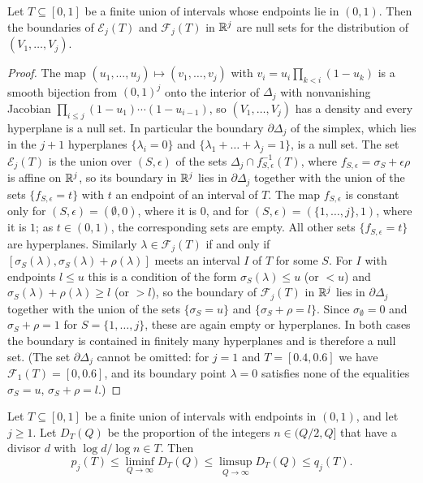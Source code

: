 \documentclass[11pt,colorlinks]{charlie}
\newcommand{\cE}{\mathcal{E}}
\newcommand{\cF}{\mathcal{F}}
\begin{document}
\begin{lemma}\label{lem:continuity}
Let $T\subseteq[0,1]$ be a finite union of intervals whose endpoints lie in $(0,1)$. Then the boundaries of $\cE_j(T)$ and $\cF_j(T)$ in $\mathbb{R}^j$ are null sets for the distribution of $(V_1,\dots,V_j)$.
\end{lemma}

\begin{proof}
The map $(u_1,\dots,u_j)\mapsto(v_1,\dots,v_j)$ with $v_i=u_i\prod_{k<i}(1-u_k)$ is a smooth bijection from $(0,1)^j$ onto the interior of $\Delta_j$ with nonvanishing Jacobian $\prod_{i\le j}(1-u_1)\cdots(1-u_{i-1})$, so $(V_1,\dots,V_j)$ has a density and every hyperplane is a null set. In particular the boundary $\partial\Delta_j$ of the simplex, which lies in the $j+1$ hyperplanes $\{\lambda_i=0\}$ and $\{\lambda_1+\dots+\lambda_j=1\}$, is a null set. The set $\cE_j(T)$ is the union over $(S,\epsilon)$ of the sets $\Delta_j\cap f_{S,\epsilon}^{-1}(T)$, where $f_{S,\epsilon}=\sigma_S+\epsilon\rho$ is affine on $\mathbb{R}^j$, so its boundary in $\mathbb{R}^j$ lies in $\partial\Delta_j$ together with the union of the sets $\{f_{S,\epsilon}=t\}$ with $t$ an endpoint of an interval of $T$. The map $f_{S,\epsilon}$ is constant only for $(S,\epsilon)=(\emptyset,0)$, where it is $0$, and for $(S,\epsilon)=(\{1,\dots,j\},1)$, where it is $1$; as $t\in(0,1)$, the corresponding sets are empty. All other sets $\{f_{S,\epsilon}=t\}$ are hyperplanes. Similarly $\lambda\in\cF_j(T)$ if and only if $[\sigma_S(\lambda),\sigma_S(\lambda)+\rho(\lambda)]$ meets an interval $I$ of $T$ for some $S$. For $I$ with endpoints $l\le u$ this is a condition of the form $\sigma_S(\lambda)\le u$ (or $<u$) and $\sigma_S(\lambda)+\rho(\lambda)\ge l$ (or $>l$), so the boundary of $\cF_j(T)$ in $\mathbb{R}^j$ lies in $\partial\Delta_j$ together with the union of the sets $\{\sigma_S=u\}$ and $\{\sigma_S+\rho=l\}$. Since $\sigma_\emptyset=0$ and $\sigma_S+\rho=1$ for $S=\{1,\dots,j\}$, these are again empty or hyperplanes. In both cases the boundary is contained in finitely many hyperplanes and is therefore a null set. (The set $\partial\Delta_j$ cannot be omitted: for $j=1$ and $T=[0.4,0.6]$ we have $\cF_1(T)=[0,0.6]$, and its boundary point $\lambda=0$ satisfies none of the equalities $\sigma_S=u$, $\sigma_S+\rho=l$.)
\end{proof}

\begin{proposition}\label{prop:transfer}
Let $T\subseteq[0,1]$ be a finite union of intervals with endpoints in $(0,1)$, and let $j\ge1$. Let $D_T(Q)$ be the proportion of the integers $n\in(Q/2,Q]$ that have a divisor $d$ with $\log d/\log n\in T$. Then
\[
 p_j(T)\le\liminf_{Q\to\infty}D_T(Q)\le\limsup_{Q\to\infty}D_T(Q)\le q_j(T).
\]
\end{proposition}
\end{document}
